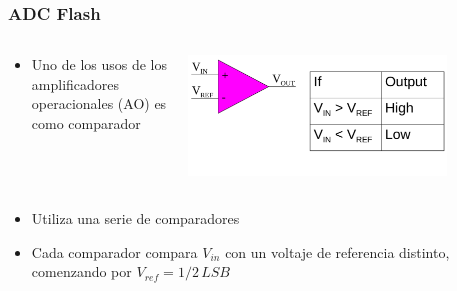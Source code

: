 \documentclass{beamer}
\begin{document}
\begin{frame}
\frametitle{ADC Flash}
  \begin{columns}
    \begin{column}{0.40\textwidth}
      \begin{block}{}
        \begin{itemize}
          \item  Uno de los usos de los amplificadores operacionales (AO) es como comparador
        \end{itemize}
      \end{block}
    \end{column} 
    \begin{column}{0.60\textwidth}
      \includegraphics[height=0.35\textheight,width=0.8\textwidth]{d3/ao_comparador}
    \end{column}
  \end{columns}
  \begin{columns}
    \begin{column}{0.65\textwidth}
      \begin{block}{}
        \begin{itemize}
         \item  Utiliza una serie de comparadores
          \item  Cada comparador compara $V_{in}$ con un voltaje de referencia
distinto, comenzando por $V_{ref} = 1/2\,LSB$
        \end{itemize}
      \end{block}
    \end{column}
    \begin{column}{0.35\textwidth}

\end{column}
\end{columns}
\end{frame}
\end{document}
